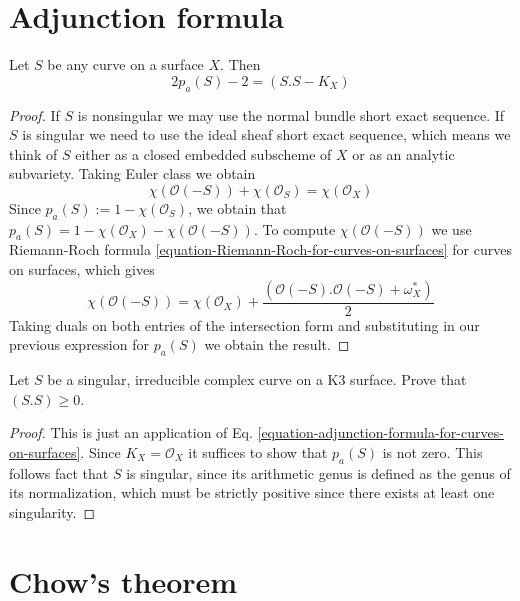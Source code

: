\section{Adjunction formula}
\label{section-adjunction-formula}

\begin{lemma}
\label{lemma-adjunction-formula-for-curves-on-surfaces}
Let $S$ be any curve on a surface $X$. Then
\begin{equation}
\label{equation-adjunction-formula-for-curves-on-surfaces}
2p_a(S)-2=(S.S-K_X)
\end{equation}
\end{lemma}

\begin{proof}
If $S$ is nonsingular we may use the normal bundle short exact sequence. If
$S$ is singular we need to use the ideal sheaf short exact sequence, which means
we think of $S$ either as a closed embedded subscheme of $X$ or as an analytic 
subvariety. Taking Euler class we obtain
$$
\chi(\mathcal{O}(-S))+\chi(\mathcal{O}_S)=\chi(\mathcal{O}_X)
$$
Since $p_a(S):=1-\chi(\mathcal{O}_S)$, we obtain that
$p_a(S)=1-\chi(\mathcal{O}_X)-\chi(\mathcal{O}(-S))$. To compute
$\chi(\mathcal{O}(-S))$ we use Riemann-Roch formula
\ref{equation-Riemann-Roch-for-curves-on-surfaces} for curves on surfaces, which
gives
$$
\chi(\mathcal{O}(-S))=\chi(\mathcal{O}_X)
+\frac{(\mathcal{O}(-S).\mathcal{O}(-S)+\omega_X^*)}{2}
$$
Taking duals on both entries of the intersection form and substituting in our
previous expression for $p_a(S)$ we obtain the result.
\end{proof}

\begin{exercise}
\label{exercise-singular-curve-on-K3-has-positive-self-intersection}
Let $S$ be a singular, irreducible complex curve on a K3 surface. Prove that
$(S.S)\geq 0$.
\end{exercise}

\begin{proof}
This is just an application of Eq.
\ref{equation-adjunction-formula-for-curves-on-surfaces}. Since
$K_X=\mathcal{O}_X$ it suffices to show that $p_a(S)$ is not zero. This follows
fact that $S$ is singular, since its arithmetic genus is defined as the genus of
its normalization, which must be strictly positive since there exists at least
one singularity.
\end{proof}

\section{Chow's theorem}
\label{section-chow-theorem}

